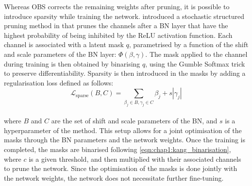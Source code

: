 Whereas \ac{OBS} corrects the remaining weights after pruning, it is possible to
introduce sparsity while training the network.
\citeauthor{DBLP:conf/icml/KangH20} introduced a stochastic structured pruning
method in \cite{DBLP:conf/icml/KangH20} that prunes the channels after a \ac{BN}
layer that have the highest probability of being inhibited by the \ac{ReLU}
activation function. Each channel is associated with a latent mask $q$,
parametrised by a function of the shift and scale parameters of the \ac{BN}
layer: $\Phi(\beta,\gamma)$. The mask applied to the channel during training is
then obtained by binarising $q$, using the Gumble Softmax trick
\cite{DBLP:conf/iclr/JangGP17} to preserve differentiability. Sparsity is then
introduced in the masks by adding a regularisation loss defined as follows:\\ 





\begin{equation}
 \mathcal{L}_{\text{{sparse}}}(B, C) = \sum_{\beta_j \in B, \gamma_j \in C} \beta_j + s|\gamma_j|
\end{equation}\\

\noindent where $B$ and $C$ are the set of shift and scale parameters of the
\ac{BN}, and $s$ is a hyperparameter of the method. This setup allows for a
joint optimisation of the masks through the \ac{BN} parameters and the network
weights. Once the training is completed, the masks are binarised following
\cref{eqn:chap1:kang_binarisation}, where $c$ is a given threshold, and then
multiplied with their associated channels to prune the network. Since the
optimisation of the masks is done jointly with the network weights, the network
does not necessitate further fine-tuning.\\


